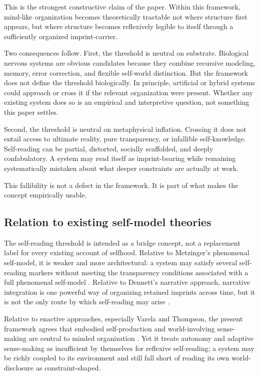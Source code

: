 \documentclass[12pt,a4paper]{article}
\begin{document}
This is the strongest constructive claim of the paper. Within this framework, mind-like organization becomes theoretically tractable not where structure first appears, but where structure becomes reflexively legible to itself through a sufficiently organized imprint-carrier.

Two consequences follow. First, the threshold is neutral on substrate. Biological nervous systems are obvious candidates because they combine recursive modeling, memory, error correction, and flexible self-world distinction. But the framework does not define the threshold biologically. In principle, artificial or hybrid systems could approach or cross it if the relevant organization were present. Whether any existing system does so is an empirical and interpretive question, not something this paper settles.

Second, the threshold is neutral on metaphysical inflation. Crossing it does not entail access to ultimate reality, pure transparency, or infallible self-knowledge. Self-reading can be partial, distorted, socially scaffolded, and deeply confabulatory. A system may read itself as imprint-bearing while remaining systematically mistaken about what deeper constraints are actually at work.

This fallibility is not a defect in the framework. It is part of what makes the concept empirically usable.

\subsection{Relation to existing self-model theories}

The self-reading threshold is intended as a bridge concept, not a replacement label for every existing account of selfhood. Relative to Metzinger's phenomenal self-model, it is weaker and more architectural: a system may satisfy several self-reading markers without meeting the transparency conditions associated with a full phenomenal self-model \cite{Metzinger2003}. Relative to Dennett's narrative approach, narrative integration is one powerful way of organizing retained imprints across time, but it is not the only route by which self-reading may arise \cite{Dennett1992}.

Relative to enactive approaches, especially Varela and Thompson, the present framework agrees that embodied self-production and world-involving sense-making are central to minded organization \cite{VarelaThompsonRosch1991,Thompson2007}. Yet it treats autonomy and adaptive sense-making as insufficient by themselves for reflexive self-reading; a system may be richly coupled to its environment and still fall short of reading its own world-disclosure as constraint-shaped.
\end{document}
